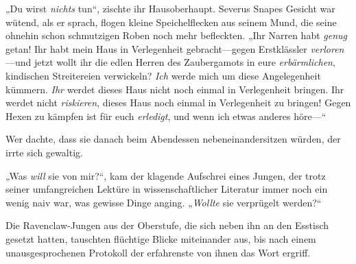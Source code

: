 „Du wirst \emph{nichts} tun“, zischte ihr Hausoberhaupt. Severus Snapes Gesicht war wütend, als er sprach, flogen kleine Speichelflecken aus seinem Mund, die seine ohnehin schon schmutzigen Roben noch mehr befleckten. „Ihr Narren habt \emph{genug} getan! Ihr habt mein Haus in Verlegenheit gebracht—gegen Erstklässler \emph{verloren}—und jetzt wollt ihr die edlen Herren des Zaubergamots in eure \emph{erbärmlichen}, kindischen Streitereien verwickeln? \emph{Ich} werde mich um diese Angelegenheit kümmern. \emph{Ihr} werdet dieses Haus nicht noch einmal in Verlegenheit bringen. Ihr werdet nicht \emph{riskieren}, dieses Haus noch einmal in Verlegenheit zu bringen! Gegen Hexen zu kämpfen ist für euch \emph{erledigt}, und wenn ich etwas anderes höre—“

\later

Wer dachte, dass sie danach beim Abendessen nebeneinandersitzen würden, der irrte sich gewaltig.

„Was \emph{will} sie von mir?“, kam der klagende Aufschrei eines Jungen, der trotz seiner umfangreichen Lektüre in wissenschaftlicher Literatur immer noch ein wenig naiv war, was gewisse Dinge anging. „\emph{Wollte} sie verprügelt werden?“

Die Ravenclaw-Jungen aus der Oberstufe, die sich neben ihn an den Esstisch gesetzt hatten, tauschten flüchtige Blicke miteinander aus, bis nach einem unausgesprochenen Protokoll der erfahrenste von ihnen das Wort ergriff.


